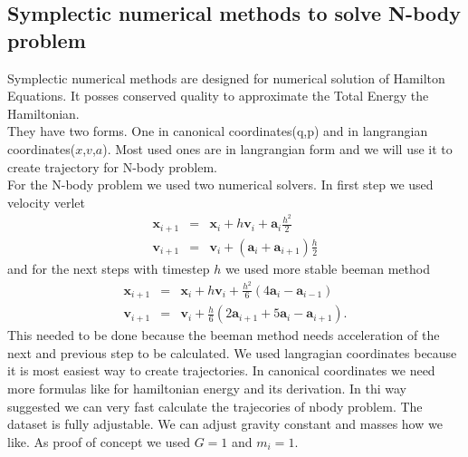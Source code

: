 \subsection{Symplectic numerical methods to solve N-body problem}
Symplectic numerical methods are designed for numerical solution of Hamilton Equations. It posses conserved quality to approximate the Total Energy the Hamiltonian.\\
They have two forms. One in canonical coordinates(q,p) and in langrangian coordinates($x$,$v$,$a$). Most used ones are in langrangian form and we will use it to create trajectory for N-body problem.\\
For the N-body problem we used two numerical solvers. In first step we used velocity verlet
\begin{eqnarray}
	\mathbf{x}_{i+1} &=& \mathbf{x}_i + h\mathbf{v}_i + \mathbf{a}_i\frac{h^2}{2} \\
	\mathbf{v}_{i+1}&=&\mathbf{v}_i + (\mathbf{a}_i +\mathbf{a}_{i+1})\frac{h}{2}
\end{eqnarray} and
for the next steps with timestep $h$ we used more stable beeman method
\begin{eqnarray}
	\mathbf{x}_{i+1} &=& \mathbf{x}_i + h\mathbf{v}_i + \frac{h^2}{6}(4\mathbf{a}_{i}-\mathbf{a}_{i-1})\\
	\mathbf{v}_{i+1}&=&\mathbf{v}_i + \frac{h}{6}(2\mathbf{a}_{i+1} + 5\mathbf{a}_i-\mathbf{a}_{i+1}).
\end{eqnarray}
This needed to be done because the beeman method needs acceleration of the next and previous step to be calculated. We used langragian coordinates because it is most easiest way to create trajectories.
In canonical coordinates we need more formulas like for hamiltonian energy and its derivation. In thi way suggested we can very fast calculate the trajecories of nbody problem. The dataset is fully adjustable. We can adjust gravity constant and masses how we like. As proof of concept we used $G=1$ and $m_i=1$.  
